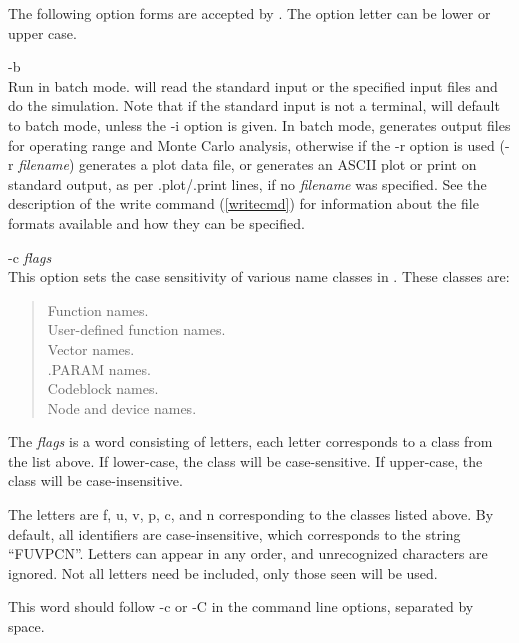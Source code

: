 The following option forms are accepted by {\WRspice}.  The option
letter can be lower or upper case.

\begin{description}
\item{\vt -b}\\
Run in batch mode.  {\WRspice} will read the standard input or the
specified input files and do the simulation.  Note that if the
standard input is not a terminal, {\WRspice} will default to batch
mode, unless the {\vt -i} option is given.  In batch mode, {\WRspice}
generates output files for operating range and Monte Carlo analysis,
otherwise if the {\vt -r} option is used ({\vt -r} {\it filename})
{\WRspice} generates a plot data file, or generates an ASCII plot or
print on standard output, as per {\vt .plot/.print} lines, if no {\it
filename} was specified.  See the description of the {\cb write}
command (\ref{writecmd}) for information about the file formats
available and how they can be specified.

\item{\vt -c} {\it flags}\\
This option sets the case sensitivity of various name classes
in {\WRspice}.  These classes are:

\begin{quote}
Function names.\\
User-defined function names.\\
Vector names.\\
.PARAM names.\\
Codeblock names.\\
Node and device names.\\
\end{quote}

The {\it flags} is a word consisting of letters, each letter
corresponds to a class from the list above.  If lower-case, the class
will be case-sensitive.  If upper-case, the class will be
case-insensitive.

The letters are {\vt f}, {\vt u}, {\vt v}, {\vt p}, {\vt c}, and {\vt
n} corresponding to the classes listed above.  By default, all
identifiers are case-insensitive, which corresponds to the string
``{\vt FUVPCN}''.  Letters can appear in any order, and unrecognized
characters are ignored.  Not all letters need be included, only those
seen will be used.

This word should follow {\vt -c} or {\vt -C} in the command line
options, separated by space.


\end{description}
